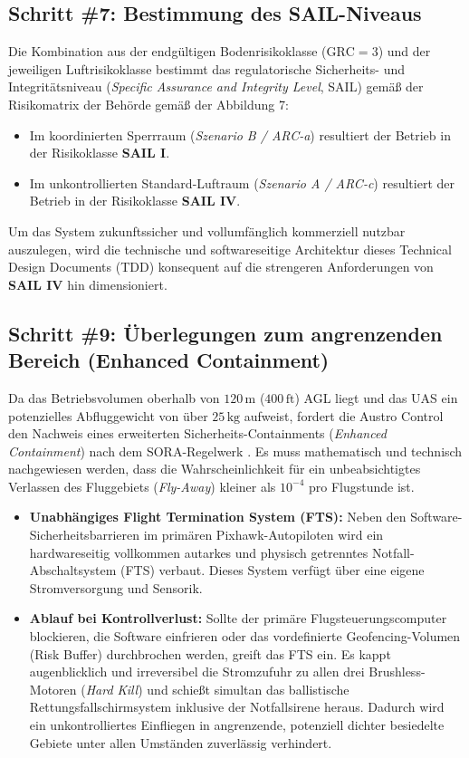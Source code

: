 \subsection{Schritt \#7: Bestimmung des SAIL-Niveaus}
Die Kombination aus der endgültigen Bodenrisikoklasse ($\text{GRC} = 3$) und der jeweiligen Luftrisikoklasse bestimmt das regulatorische Sicherheits- 
und Integritätsniveau (\textit{Specific Assurance and Integrity Level}, SAIL) gemäß der Risikomatrix der Behörde \cite{austrocontrol_sora} gemäß der Abbildung 7:
\begin{itemize}
    \item Im koordinierten Sperrraum (\textit{Szenario B / ARC-a}) resultiert der Betrieb in der Risikoklasse \textbf{SAIL I}.
    \item Im unkontrollierten Standard-Luftraum (\textit{Szenario A / ARC-c}) resultiert der Betrieb in der Risikoklasse \textbf{SAIL IV}.
\end{itemize}
Um das System zukunftssicher und vollumfänglich kommerziell nutzbar auszulegen, wird die technische und softwareseitige Architektur dieses Technical Design Documents (TDD) konsequent auf die strengeren Anforderungen von \textbf{SAIL IV} hin dimensioniert.

\subsection{Schritt \#9: Überlegungen zum angrenzenden Bereich (Enhanced Containment)}
Da das Betriebsvolumen oberhalb von $120\,\text{m}$ ($400\,\text{ft}$) AGL liegt und das UAS ein potenzielles Abfluggewicht von über $25\,\text{kg}$ aufweist, 
fordert die Austro Control den Nachweis eines erweiterten Sicherheits-Containments (\textit{Enhanced Containment}) nach dem SORA-Regelwerk \cite{austrocontrol_sora}. 
Es muss mathematisch und technisch nachgewiesen werden, dass die Wahrscheinlichkeit für ein unbeabsichtigtes Verlassen des Fluggebiets (\textit{Fly-Away}) kleiner als $10^{-4}$ pro Flugstunde ist.

\begin{itemize}
    \item \textbf{Unabhängiges Flight Termination System (FTS):} Neben den Software-Sicherheitsbarrieren im primären Pixhawk-Autopiloten wird ein hardwareseitig vollkommen autarkes und physisch getrenntes Notfall-Abschaltsystem (FTS) verbaut. 
                                                                 Dieses System verfügt über eine eigene Stromversorgung und Sensorik.
    \item \textbf{Ablauf bei Kontrollverlust:} Sollte der primäre Flugsteuerungscomputer blockieren, die Software einfrieren oder das vordefinierte Geofencing-Volumen (Risk Buffer) durchbrochen werden, 
                                               greift das FTS ein. Es kappt augenblicklich und irreversibel die Stromzufuhr zu allen drei Brushless-Motoren (\textit{Hard Kill}) 
                                               und schießt simultan das ballistische Rettungsfallschirmsystem inklusive der Notfallsirene heraus. Dadurch wird ein unkontrolliertes Einfliegen in angrenzende, 
                                               potenziell dichter besiedelte Gebiete unter allen Umständen zuverlässig verhindert.
\end{itemize}
